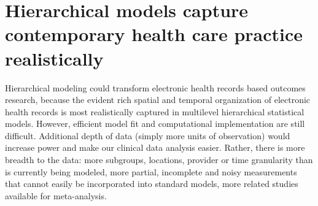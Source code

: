 \documentclass[11pt,notitlepage]{article}
\begin{document}
\section*{Hierarchical models capture contemporary health care practice realistically}
Hierarchical modeling could transform electronic health records based outcomes research, because the evident rich spatial and temporal organization of electronic health records is most realistically captured in multilevel hierarchical statistical models. However, efficient model fit and computational implementation are still difficult.  Additional depth of data (simply more units of observation) would increase power and make our clinical data analysis easier. Rather, there is more breadth to the data: more subgroups, locations, provider or time granularity than is currently being modeled, more partial, incomplete and noisy measurements that cannot easily be incorporated into standard models, more related studies available for meta-analysis\cite{Andreae2015,Andreae2012}.

\end{document}
